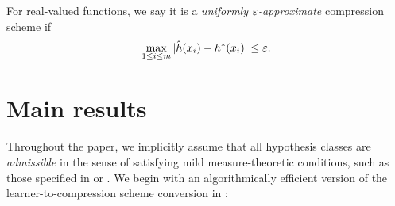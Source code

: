 For real-valued functions, %
we say it is a \emph{uniformly $\varepsilon$-approximate} compression scheme if 
\[
\max_{1 \leq i \leq m} | \hat{h}(x_i) - h^*(x_i) | \leq \varepsilon.
\]


%
%






    


\section{Main results}
\label{sec:main-res}

Throughout the paper, we implicitly assume that all hypothesis classes are {\em admissible} in the sense
of satisfying mild measure-theoretic conditions, such as those specified in
\citet[Section 10.3.1]{MR876079}
or
\citet[Appendix C]{pollard84}.
We begin with an algorithmically efficient version
of the learner-to-compression scheme conversion in
\citet{DBLP:journals/jacm/MoranY16}:

